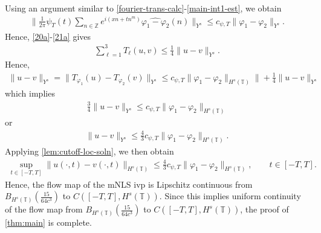 \documentclass[12pt,reqno]{amsart}
\numberwithin{equation}{section}  %
\numberwithin{figure}{section}
\newcommand{\zz}{\mathbb{Z}}
\newcommand{\ci}{\mathbb{T}}
\newcommand{\wh}{\widehat}
\newcommand{\vp}{\varphi}
\theoremstyle{plain}
\theoremstyle{definition}
\theoremstyle{remark}
\begin{document}
%
%
Using an argument similar to \eqref{fourier-trans-calc}-\eqref{main-int1-est},
we obtain
%
%
\begin{equation*}
	\begin{split}
		\| \frac{1}{2\pi} \psi_{T}(t) \sum_{n \in
		\zz}e^{i\left( xn + tn^{m} \right)} \wh{\vp_1 - \vp_2}(n)\|_{Y^s}
		\le c_{\psi,T} \|\vp_{1} - \vp_{2}\|_{Y^s}.
	\end{split}
\end{equation*}
%
%
Hence, \eqref{20a}-\eqref{21a} gives
%
%
\begin{equation*}
	\begin{split}
    \sum_{\ell=1}^{3} T_{\ell}(u,v) \le \frac{1}{4}\|u-v\|_{Y^s}.
	\end{split}
\end{equation*}
%
%
Hence,
%
%
\begin{equation*}
	\begin{split}
		\|u -v \|_{Y^s} = \|T_{\vp_1}(u) - T_{\vp_2}(v) \|_{Y^s} \le c_{\psi,T}
		\|\vp_{1} - \vp_{2} \|_{H^{s}\left( \ci \right)}\| +
		\frac{1}{4} \|u -v \|_{Y^s}
	\end{split}
\end{equation*}
%
%
which implies
%
%
\begin{equation*}
	\begin{split}
		\frac{3}{4} \|u-v\|_{Y^s} \le c_{\psi,T} \|\vp_1 - \vp_2 \|_{H^s(\ci)}
	\end{split}
\end{equation*}
%
%
or
%
%
\begin{equation*}
	\begin{split}
		\|u -v \|_{Y^s} \le \frac{4}{3} c_{\psi,T} \|\vp_1 - \vp_2 \|_{H^{s}(\ci)}.
	\end{split}
\end{equation*}
%
%
Applying \autoref{lem:cutoff-loc-soln}, we then obtain
%
%
	 \begin{equation*}
		 \begin{split}
       \sup_{t \in \left[ -T, T \right]}\|u(\cdot, t) -v(\cdot, t) \|_{H^s(\ci)} \le \frac{4}{3} c_{\psi,T} \|\vp_1 -
			\vp_2 \|_{H^{s}(\ci)}, \qquad t \in [-T, T].
		 \end{split}
	 \end{equation*}
   Hence, the flow map of the mNLS ivp is Lipschitz continuous from
   $B_{H^{s}(\ci)}( \frac{15}{64c^{3}})$ to  $C(\left[ -T, T \right],
   H^{s}(\ci))$. Since this implies uniform continuity of the flow map from
   $B_{H^{s}(\ci)}( \frac{15}{64c^{3}})$ to  $C(\left[ -T, T \right],
   H^{s}(\ci))$, the proof of \autoref{thm:main} is complete. \qquad
   \qedsymbol
%
%
%
%
\end{document}
